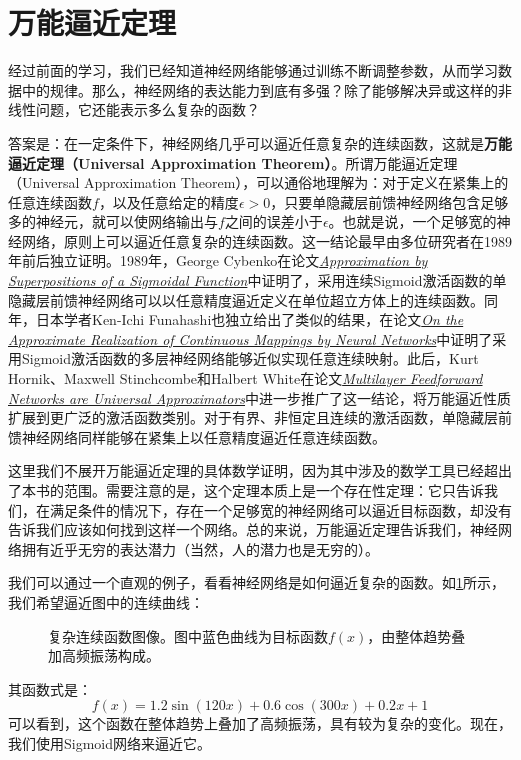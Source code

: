 \section{万能逼近定理}

经过前面的学习，我们已经知道神经网络能够通过训练不断调整参数，从而学习数据中的规律。那么，神经网络的表达能力到底有多强？除了能够解决异或这样的非线性问题，它还能表示多么复杂的函数？

答案是：在一定条件下，神经网络几乎可以逼近任意复杂的连续函数，这就是\textbf{万能逼近定理（Universal Approximation Theorem）}。所谓万能逼近定理（Universal Approximation Theorem），可以通俗地理解为：对于定义在紧集上的任意连续函数$f$，以及任意给定的精度$\epsilon>0$，只要单隐藏层前馈神经网络包含足够多的神经元，就可以使网络输出与$f$之间的误差小于$\epsilon$。也就是说，一个足够宽的神经网络，原则上可以逼近任意复杂的连续函数。这一结论最早由多位研究者在1989年前后独立证明。1989年，George Cybenko在论文\href{https://doi.org/10.1007/BF02551274}{\textit{Approximation by Superpositions of a Sigmoidal Function}}中证明了，采用连续Sigmoid激活函数的单隐藏层前馈神经网络可以以任意精度逼近定义在单位超立方体上的连续函数。同年，日本学者Ken-Ichi Funahashi也独立给出了类似的结果，在论文\href{https://doi.org/10.1016/0893-6080(89)90003-8}{\textit{On the Approximate Realization of Continuous Mappings by Neural Networks}}中证明了采用Sigmoid激活函数的多层神经网络能够近似实现任意连续映射。此后，Kurt Hornik、Maxwell Stinchcombe和Halbert White在论文\href{https://doi.org/10.1016/0893-6080(89)90020-8}{\textit{Multilayer Feedforward Networks are Universal Approximators}}中进一步推广了这一结论，将万能逼近性质扩展到更广泛的激活函数类别。对于有界、非恒定且连续的激活函数，单隐藏层前馈神经网络同样能够在紧集上以任意精度逼近任意连续函数。

这里我们不展开万能逼近定理的具体数学证明，因为其中涉及的数学工具已经超出了本书的范围。需要注意的是，这个定理本质上是一个存在性定理：它只告诉我们，在满足条件的情况下，存在一个足够宽的神经网络可以逼近目标函数，却没有告诉我们应该如何找到这样一个网络。总的来说，万能逼近定理告诉我们，神经网络拥有近乎无穷的表达潜力（当然，人的潜力也是无穷的）。

我们可以通过一个直观的例子，看看神经网络是如何逼近复杂的函数。如\cref{fig:complex_function_2d}所示，我们希望逼近图中的连续曲线：

\begin{figure}[H]
    \caption{复杂连续函数图像。图中蓝色曲线为目标函数$f(x)$，由整体趋势叠加高频振荡构成。}
    \label{fig:complex_function_2d}
\end{figure}
其函数式是：
$$
f(x) = 1.2\sin(120x) + 0.6\cos(300x) + 0.2x + 1
$$
可以看到，这个函数在整体趋势上叠加了高频振荡，具有较为复杂的变化。现在，我们使用Sigmoid网络来逼近它。

